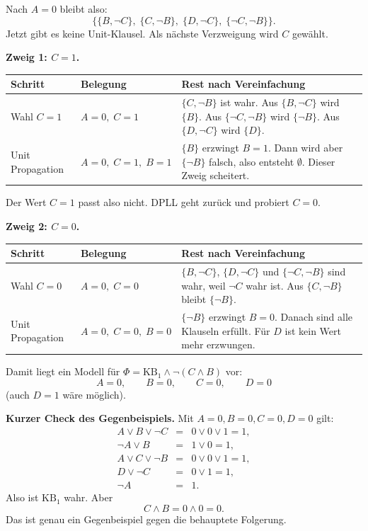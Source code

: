\documentclass[a4paper,12pt]{article}
\begin{document}
Nach $A=0$ bleibt also:
\[
\{\{B,\neg C\},\;\{C,\neg B\},\;\{D,\neg C\},\;\{\neg C,\neg B\}\}.
\]
Jetzt gibt es keine Unit-Klausel. Als n\"achste Verzweigung wird $C$
gew\"ahlt.

\medskip
\textbf{Zweig 1: $C=1$.}

\begin{center}
\renewcommand{\arraystretch}{1.25}
\begin{tabular}{p{}p{}p{}}
\toprule
Schritt & Belegung & Rest nach Vereinfachung \\
\midrule
Wahl $C=1$
& $A=0,\;C=1$
& $\{C,\neg B\}$ ist wahr.
  Aus $\{B,\neg C\}$ wird $\{B\}$.
  Aus $\{\neg C,\neg B\}$ wird $\{\neg B\}$.
  Aus $\{D,\neg C\}$ wird $\{D\}$. \\
\midrule
Unit Propagation
& $A=0,\;C=1,\;B=1$
& $\{B\}$ erzwingt $B=1$.
  Dann wird aber $\{\neg B\}$ falsch, also entsteht
  $\emptyset$. Dieser Zweig scheitert. \\
\bottomrule
\end{tabular}
\end{center}

Der Wert $C=1$ passt also nicht. DPLL geht zur\"uck und probiert $C=0$.

\medskip
\textbf{Zweig 2: $C=0$.}

\begin{center}
\renewcommand{\arraystretch}{1.25}
\begin{tabular}{p{}p{}p{}}
\toprule
Schritt & Belegung & Rest nach Vereinfachung \\
\midrule
Wahl $C=0$
& $A=0,\;C=0$
& $\{B,\neg C\}$, $\{D,\neg C\}$ und $\{\neg C,\neg B\}$
  sind wahr, weil $\neg C$ wahr ist.
  Aus $\{C,\neg B\}$ bleibt $\{\neg B\}$. \\
\midrule
Unit Propagation
& $A=0,\;C=0,\;B=0$
& $\{\neg B\}$ erzwingt $B=0$.
  Danach sind alle Klauseln erf\"ullt. F\"ur $D$ ist kein Wert mehr
  erzwungen. \\
\bottomrule
\end{tabular}
\end{center}

Damit liegt ein Modell f\"ur
$\Phi = \mathrm{KB}_1 \wedge \neg(C\wedge B)$ vor:
\[
A=0,\qquad B=0,\qquad C=0,\qquad D=0
\]
(auch $D=1$ w\"are m\"oglich).

\medskip
\textbf{Kurzer Check des Gegenbeispiels.}
Mit $A=0,B=0,C=0,D=0$ gilt:
\[
\begin{array}{rcl}
A \vee B \vee \neg C &=& 0 \vee 0 \vee 1 = 1,\\
\neg A \vee B &=& 1 \vee 0 = 1,\\
A \vee C \vee \neg B &=& 0 \vee 0 \vee 1 = 1,\\
D \vee \neg C &=& 0 \vee 1 = 1,\\
\neg A &=& 1.
\end{array}
\]
Also ist $\mathrm{KB}_1$ wahr. Aber
\[
C \wedge B = 0 \wedge 0 = 0.
\]
Das ist genau ein Gegenbeispiel gegen die behauptete Folgerung.
\end{document}

